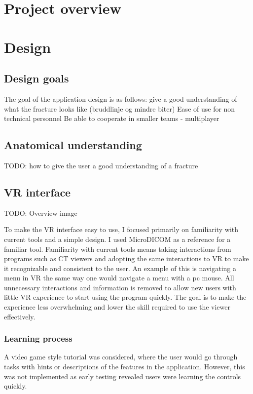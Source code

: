 \documentclass[a4paper]{report}
\begin{document}
\section{Project overview}\label{CodeStructure}

\section{Design}

\subsection{Design goals}

The goal of the application design is as follows:
give a good understanding of what the fracture looks like (bruddlinje og mindre biter)
Ease of use for non technical personnel
Be able to cooperate in smaller teams - multiplayer

\subsection{Anatomical understanding}
TODO: how to give the user a good understanding of a fracture

\subsection{VR interface}

TODO: Overview image

To make the VR interface easy to use, I focused primarily on familiarity with current tools and a simple design.
I used MicroDICOM\cite{MicroDICOM} as a reference for a familiar tool.
Familiarity with current tools means taking interactions from programs such as CT viewers and adopting the same interactions to VR to make it recognizable and consistent to the user. An example of this is navigating a menu in VR the same way one would navigate a menu with a pc mouse.
 All unnecessary interactions and information is removed to allow new users with little VR experience to start using the program quickly. The goal is to make the experience less overwhelming and lower the skill required to use the viewer effectively.

\subsubsection{Learning process}
A video game style tutorial was considered, where the user would go through tasks with hints or descriptions of the features in the application. However, this was not implemented as early testing revealed users were learning the controls quickly.
\end{document}
